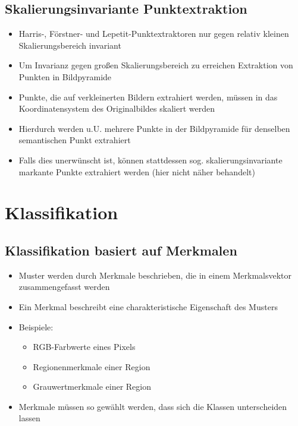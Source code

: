\documentclass[11pt]{article}
\begin{document}
\subsection{Skalierungsinvariante Punktextraktion}

\begin{itemize}
    \item Harris-, Förstner- und Lepetit-Punktextraktoren nur gegen relativ kleinen Skalierungsbereich invariant
    \item Um Invarianz gegen großen Skalierungsbereich zu erreichen Extraktion von Punkten in Bildpyramide
    \item Punkte, die auf verkleinerten Bildern extrahiert werden, müssen in das Koordinatensystem des Originalbildes skaliert werden
    \item Hierdurch werden u.U. mehrere Punkte in der Bildpyramide für denselben semantischen Punkt extrahiert
    \item Falls dies unerwünscht ist, können stattdessen sog. skalierungsinvariante markante Punkte extrahiert werden (hier nicht näher behandelt)
\end{itemize}

\section{Klassifikation}
\subsection{Klassifikation basiert auf Merkmalen}

\begin{itemize}
    \item Muster werden durch Merkmale beschrieben, die in einem Merkmalsvektor zusammengefasst werden
    \item Ein Merkmal beschreibt eine charakteristische Eigenschaft des Musters
    \item Beispiele:
        \begin{itemize}
            \item RGB-Farbwerte eines Pixels
            \item Regionenmerkmale einer Region
            \item Grauwertmerkmale einer Region
        \end{itemize}
    \item Merkmale müssen so gewählt werden, dass sich die Klassen unterscheiden lassen
\end{itemize}
\end{document}
